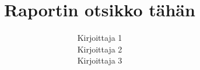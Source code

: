 \documentclass{watson}
\title{Raportin otsikko tähän}
\author{Kirjoittaja 1\\
        Kirjoittaja 2\\
        Kirjoittaja 3}
\begin{document}
\watsonfrontmatter





\newpage
\begin{appendix}
  
\end{appendix}


\newpage
\printbibliography
\end{document}
